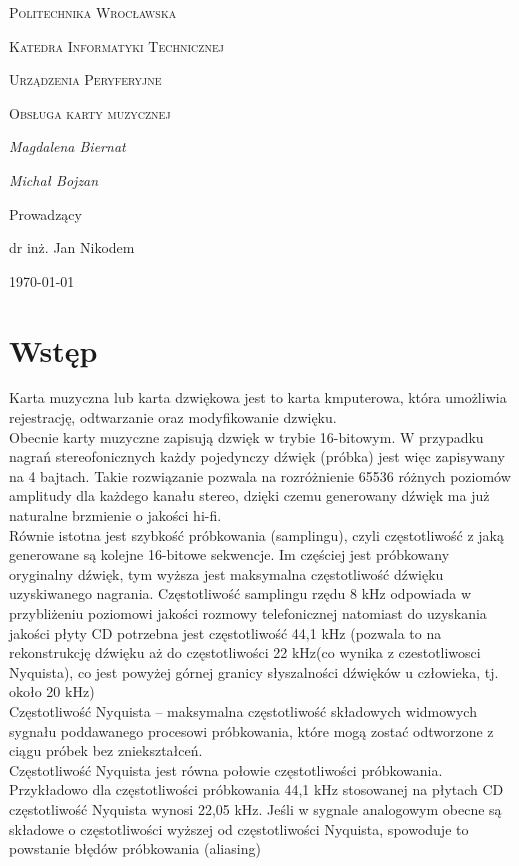 \documentclass[12pt]{article}
\begin{document}
	
	\begin{titlepage}
		\centering
		{\scshape\LARGE Politechnika Wrocławska \par}
		{\scshape\Large Katedra Informatyki Technicznej\par}
		
		\vspace{1.5cm}
		{\scshape\Large Urządzenia Peryferyjne \par}
		\vspace{1.5cm}
		{\scshape\Huge Obsługa karty muzycznej }
		\vspace{1.5cm}
	
		\vspace{2cm}
		{\Large\itshape Magdalena Biernat\par}
		{\Large\itshape Michał Bojzan \par}
		\vfill\flushleft\large
	
		
		\normalsize	\centering	\vspace{3cm}
		Prowadzący\par
		dr inż. Jan Nikodem 

		\vfill
		{\large \today\par}
	\end{titlepage}

	\newpage
\section{Wstęp}
Karta muzyczna lub karta dzwiękowa jest to karta kmputerowa, która umożliwia rejestrację, odtwarzanie oraz modyfikowanie dzwięku.
\\Obecnie karty muzyczne zapisują dzwięk w trybie 16-bitowym. W przypadku nagrań stereofonicznych każdy pojedynczy dźwięk (próbka) jest więc zapisywany na 4 bajtach. Takie rozwiązanie pozwala na rozróżnienie 65536 różnych poziomów amplitudy dla każdego kanału stereo, dzięki czemu generowany dźwięk ma już naturalne brzmienie o jakości hi-fi.
\\Równie istotna jest szybkość próbkowania (samplingu), czyli częstotliwość z jaką generowane są kolejne 16-bitowe sekwencje. Im częściej jest próbkowany oryginalny dźwięk, tym wyższa jest maksymalna częstotliwość dźwięku uzyskiwanego nagrania. Częstotliwość samplingu rzędu 8 kHz odpowiada w przybliżeniu poziomowi jakości rozmowy telefonicznej natomiast do uzyskania jakości płyty CD potrzebna jest częstotliwość 44,1 kHz (pozwala to na rekonstrukcję dźwięku aż do częstotliwości 22 kHz(co wynika z czestotliwosci Nyquista), co jest powyżej górnej granicy słyszalności dźwięków u człowieka, tj. około 20 kHz)
\\Częstotliwość Nyquista – maksymalna częstotliwość składowych widmowych sygnału poddawanego procesowi próbkowania, które mogą zostać odtworzone z ciągu próbek bez zniekształceń. 
\\ Częstotliwość Nyquista jest równa połowie częstotliwości próbkowania.
Przykładowo dla częstotliwości próbkowania 44,1 kHz stosowanej na płytach CD częstotliwość Nyquista wynosi 22,05 kHz. Jeśli w sygnale analogowym obecne są składowe o częstotliwości wyższej od częstotliwości Nyquista, spowoduje to powstanie błędów próbkowania (aliasing)
\end{document}
